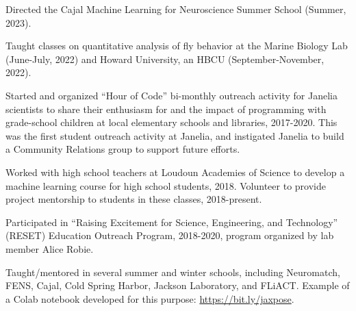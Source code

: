 \documentclass[11pt, letterpaper]{awesome-cv}
\begin{document}
\begin{cvitems}
\item Directed the Cajal Machine Learning for Neuroscience Summer School (Summer, 2023). 
\item Taught classes on quantitative analysis of fly behavior at the Marine Biology Lab (June-July, 2022) and Howard University, an HBCU (September-November, 2022). 
\item Started and organized ``Hour of Code'' bi-monthly outreach activity for Janelia scientists to share their enthusiasm for and the impact of programming with grade-school children at local elementary schools and libraries, 2017-2020. This was the first student outreach activity at Janelia, and instigated Janelia to build a Community Relations group to support future efforts. 
\item Worked with high school teachers at Loudoun Academies of Science to develop a machine learning course for high school students, 2018. Volunteer to provide project mentorship to students in these classes, 2018-present.
\item Participated in ``Raising Excitement for Science, Engineering, and Technology'' (RESET) Education Outreach Program, 2018-2020, program organized by lab member Alice Robie. 
\item Taught/mentored in several summer and winter schools, including Neuromatch, FENS, Cajal, Cold Spring Harbor, Jackson Laboratory, and FLiACT. Example of a Colab notebook developed for this purpose: \url{https://bit.ly/jaxpose}.
\end{cvitems}
\vspace{\acvSectionContentTopSkip}


\vspace{\acvSectionContentTopSkip}
\vspace{2mm}

\end{document}
